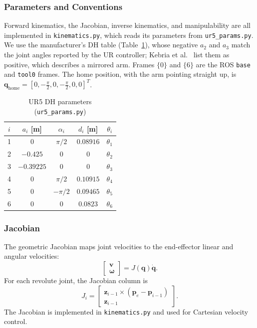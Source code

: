 \documentclass[conference]{IEEEtran}
\begin{document}
\subsubsection{Parameters and Conventions}
Forward kinematics, the Jacobian, inverse kinematics, and manipulability are all implemented in \texttt{kinematics.py}, which reads its parameters from \texttt{ur5\_params.py}. We use the manufacturer's 
DH table (Table~\ref{tab:dh}), whose negative $a_2$ and $a_3$ match the joint angles reported by 
the UR controller; Kebria et al.~\cite{kebria2016} list them as positive, which describes a mirrored 
arm. Frames $\{0\}$ and $\{6\}$ are the ROS \texttt{base} and \texttt{tool0} frames. The home position, 
with the arm pointing straight up, is $\mathbf q_{\text{home}}=[0,-\tfrac{\pi}{2},0,-\tfrac{\pi}{2},0,0]^T$.

\begin{table}[t]
    \caption{UR5 DH parameters (\texttt{ur5\_params.py})}
    \label{tab:dh}
    \centering
    \small
    \begin{tabular}{@{}ccccc@{}}
        \toprule
        $i$ & $a_i$ [m]  & $\alpha_i$ & $d_i$ [m]  & $\theta_i$ \\
        \midrule
        1   & 0          & $\pi/2$    & $0.08916$  & $\theta_1$ \\
        2   & $-0.425$   & 0          & 0          & $\theta_2$ \\
        3   & $-0.39225$ & 0          & 0          & $\theta_3$ \\
        4   & 0          & $\pi/2$    & $0.10915$  & $\theta_4$ \\
        5   & 0          & $-\pi/2$   & $0.09465$  & $\theta_5$ \\
        6   & 0          & 0          & $0.0823$   & $\theta_6$ \\
        \bottomrule
    \end{tabular}
\end{table}

\subsubsection{Jacobian}
The geometric Jacobian maps joint velocities to
the end-effector linear and angular velocities:
\begin{equation}
    \begin{bmatrix}
        \mathbf{v}\\
        \boldsymbol{\omega}
    \end{bmatrix}
    = J(\mathbf{q})\dot{\mathbf{q}}.
\end{equation}
For each revolute joint, the Jacobian column is
\begin{equation}
    J_i =
    \begin{bmatrix}
        \mathbf{z}_{i-1}\times
        (\mathbf{p}_e-\mathbf{p}_{i-1})\\
        \mathbf{z}_{i-1}
    \end{bmatrix}.
\end{equation}
The Jacobian is implemented in
\texttt{kinematics.py} and used for
Cartesian velocity control.
\end{document}
